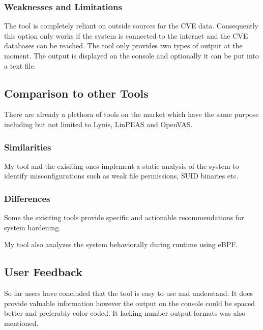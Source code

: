 \subsubsection{Weaknesses and Limitations}

The tool is completely reliant on outside sources for the CVE data.  Consequently this option only works if the system is connected to the internet and the CVE databases can be reached. \newline The tool only provides two types of output at the moment. The output is displayed on the console and optionally it can be put into a text file.

\subsection{Comparison to other Tools}

There are already a plethora of tools on the market which have the same purpose including but not limited to Lynis, LinPEAS and OpenVAS.

\subsubsection{Similarities}

My tool and the exisiting ones implement a static analysis of the system to identify misconfigurations such as weak file permissions, SUID binaries etc.

\subsubsection{Differences}

Some the exisiting tools provide specific and actionable recommendations for system hardening. \newline

My tool also analyzes the system behaviorally during runtime using eBPF.

\subsection{User Feedback}

So far users have concluded that the tool is easy to use and understand. It does provide valuable information however the output on the console could be spaced better and preferably color-coded. It lacking number output formats was also mentioned.

